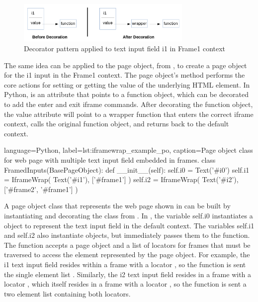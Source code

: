 \begin{figure}[tbh]
  \centering
  \includegraphics[width=0.75\textwidth]
    {../../images/decorator_pattern_applied_to_i1.png}
  \caption{Decorator pattern applied to text input field i1 in Frame1 context}
  \label{fig:decorator_pattern_i1}
\end{figure}


The same idea can be applied to the  page object, from
, to create a page object for the i1 input
in the Frame1 context. The page object's  method performs the
core actions for setting or getting the value of the underlying HTML element.
In Python,  is an attribute that points to a function object,
which can be decorated to add the enter and exit iframe commands.  After
decorating the function object, the value attribute will point to a wrapper
function that enters the correct iframe context, calls the original function
object, and returns back to the default context.


\begin{xcode}{%
  language=Python,%
  label=lst:iframewrap_example_po,%
  caption={Page object class for web page with multiple text input field %
           embedded in frames.}%
}
class FramedInputs(BasePageObject):
    def __init__(self):
        self.i0 = Text('#i0')
        self.i1 = IframeWrap( Text('#i1'), ['#frame1'] )
        self.i2 = IframeWrap( Text('#i2'), ['#frame2', '#frame1'] )
\end{xcode}

A page object class that represents the web page shown in
 can be built by instantiating and
decorating the  class from .
In , the variable self.i0 instantiates a
 object to represent the text input field in the default context.
The variables self.i1 and self.i2 also instantiate  objects, but
immediately passes them to the  function. The
 function accepts a page object and a list of locators
for frames that must be traversed to access the element represented by the page
object. For example, the i1 text input field resides within a frame with a
locator , so the  function is sent
the single element list \xfinlinecode{['\#frame1']}.  Similarly, the i2 text
input field resides in a frame with a locator , which
itself resides in a frame with a locator , so the
 function is sent a two element list containing both
locators.


